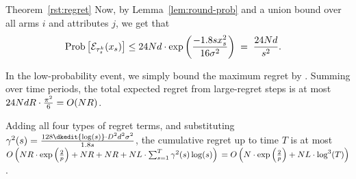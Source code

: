 \begin{emptyextraproof}{Theorem~\ref{rst:regret}}
Now, by Lemma~\ref{lem:round-prob} and a union bound over all arms $i$
and attributes $j$, we get that 
\begin{align*}
\Prob{\AccEU{\tau_s^k}{x_s}}
& \leq 24 \ARMNUM d \cdot \exp \left( \frac{-1.8 s x_s^2}{16 \sigma^2} \right)
\; = \; \frac{24 \ARMNUM d}{s^2}.
\end{align*}

In the low-probability event, we simply bound the maximum regret by \MAXR.
Summing over  time periods,
the total expected regret from large-regret steps is at most
$24 N d R \cdot \frac{\pi^2}{6} = O(N R)$.

Adding all four types of regret terms,
and substituting 
$\EarlyCut[2]{s} = \frac{128 \dkedit{\log(s)} \cdot \Diam^2 d^2 \sigma^2}{1.8 s}$,
the cumulative regret up to time $T$ is at most
$
O \left(\ARMNUM \MAXR \cdot \exp \left( \frac{2}{p} \right)
+ \ARMNUM \MAXR
+ \ARMNUM \MAXR
+ \ARMNUM \TieDensity \cdot \sum_{s=1}^{T} \EarlyCut[2]{s} \log(s) \right)\\
= 
O \left(\ARMNUM  \cdot \exp \left( \frac{2}{p} \right)
+ \ARMNUM \TieDensity \cdot \log^3(T) \right)$.\QED
\end{emptyextraproof}
